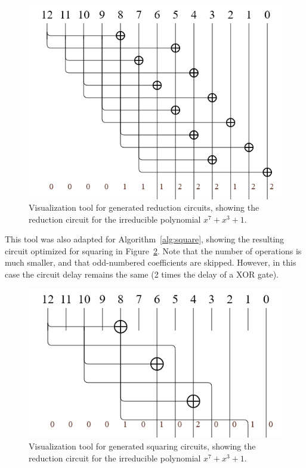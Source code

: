 \begin{figure}
  \caption{Visualization tool for generated reduction circuits, showing the reduction circuit for the irreducible polynomial $x^7 + x^3 + 1$.}
  \label{fig:circuit_reducing_7_3_0}
  \centering
  \includegraphics[width = .8\columnwidth]{figures/reducing-7-3-0.png}
\end{figure}

This tool was also adapted for Algorithm~\ref{alg:square}, showing the resulting circuit optimized for squaring in Figure~\ref{fig:circuit_squaring_7_3_0}. Note that the number of operations is much smaller, and that odd-numbered coefficients are skipped. However, in this case the circuit delay remains the same (2 times the delay of a XOR gate). \\

\begin{figure}
  \caption{Visualization tool for generated squaring circuits, showing the reduction circuit for the irreducible polynomial $x^7 + x^3 + 1$.}
  \label{fig:circuit_squaring_7_3_0}
  \centering
  \includegraphics[width = .8\columnwidth]{figures/squaring-7-3-0.png}
\end{figure}

